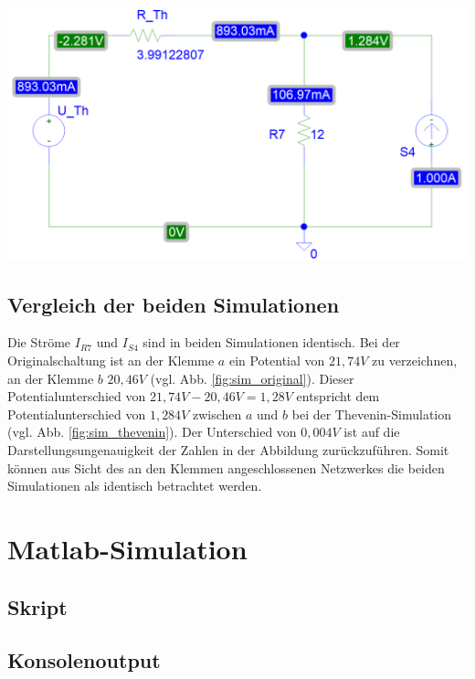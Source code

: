 \documentclass[11pt]{scrartcl}
\begin{document}
\begin{center}
  \includegraphics[width=1\linewidth]{./Assets/simulation_thevenin}
  \label{fig:sim_thevenin}
\end{center}

\subsection{Vergleich der beiden Simulationen}
Die Ströme $I_{R7}$ und $I_{S4}$ sind in beiden Simulationen identisch.
Bei der Originalschaltung ist an der Klemme $a$ ein Potential von $21,74 \unit{V}$ zu verzeichnen,
an der Klemme $b$ $20,46 \unit{V}$ (vgl. Abb. \ref{fig:sim_original}). Dieser Potentialunterschied von
$21,74 \unit{V} - 20,46 \unit{V} = 1,28 \unit{V}$ entspricht dem
Potentialunterschied von $1,284 \unit{V}$ zwischen $a$ und $b$ bei der Thevenin-Simulation (vgl. Abb. \ref{fig:sim_thevenin}).
Der Unterschied von $0,004 \unit{V}$ ist auf die Darstellungsungenauigkeit der Zahlen in der Abbildung zurückzuführen.
Somit können aus Sicht des an den Klemmen angeschlossenen Netzwerkes die beiden Simulationen als identisch betrachtet werden.

\newpage

\section{Matlab-Simulation}
\subsection{Skript}


\subsection{Konsolenoutput}\label{sec:console}
\end{document}
